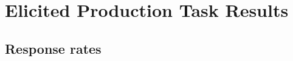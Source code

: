 
\chapter{Elicited Production Task Results}\label{app-results-ept}

\section{Response rates}\label{app-ept-token}



